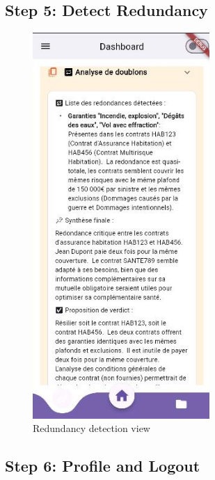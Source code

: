 \subsection*{Step 5: Detect Redundancy}

\begin{figure}[H]
    \centering
    \includegraphics[width=0.6\textwidth]{frontend/dashboard_doublon.png}
    \caption{Redundancy detection view}
\end{figure}

\subsection*{Step 6: Profile and Logout}

